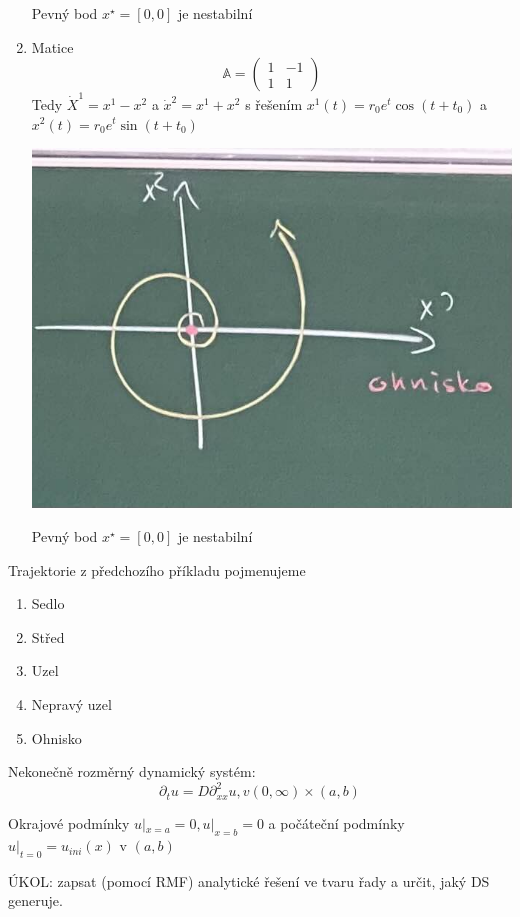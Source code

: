 \documentclass[../main.tex]{subfiles}
\begin{document}
\begin{example}
\begin{enumerate}
    Pevný bod $x^\star=[0,0]$ je nestabilní


    
    \item Matice \begin{equation}
        \mathbb{A} = \begin{pmatrix}
            1 & -1 \\
            1 & 1 
            \end{pmatrix}
    \end{equation}
    Tedy $\dot{X}^1 = x^1 - x^2$ a $\dot{x}^2 = x^1 + x^2$ s řešením $x^1(t) = r_0 e^t \cos(t + t_0)$ a $x^2(t) = r_0 e^t \sin(t+t_0) $
    \begin{center}
        \includegraphics[width=0.5\linewidth]{images/ohnisko.jpg}
    \end{center}

    Pevný bod $x^\star = [0,0]$ je nestabilní

\end{enumerate}
\end{example}


\begin{definition}
    Trajektorie z předchozího příkladu pojmenujeme

    \begin{enumerate}
        \item Sedlo 
        \item Střed 
        \item Uzel 
        \item Nepravý uzel 
        \item Ohnisko
    \end{enumerate}

\end{definition}


\begin{example}
    Nekonečně rozměrný dynamický systém:
    \begin{equation}
        \partial_t u = D\partial^2_{xx} u, v (0,\infty) \times (a,b)
    \end{equation}

    Okrajové podmínky $u|_{x=a} = 0, u|_{x=b} = 0$ a počáteční podmínky $u|_{t=0} = u_{ini}(x)$ v $(a,b)$


    ÚKOL: zapsat (pomocí RMF) analytické řešení ve tvaru řady a určit, jaký DS generuje. 
\end{example}
\end{document}
